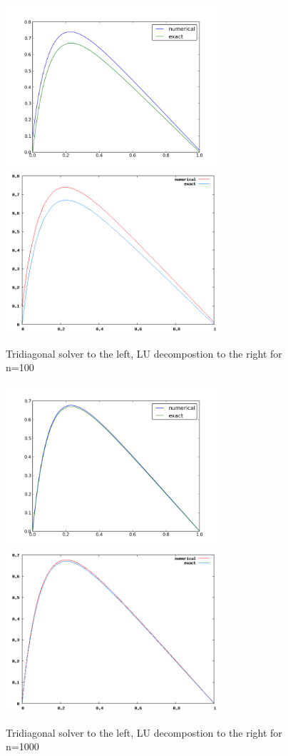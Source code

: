\documentclass[12pt,a4wide]{article}
\begin{document}
\begin{figure}
	\includegraphics[width=8cm]{project1n100}
	\includegraphics[width=8cm]{LUn100}
	\caption{Tridiagonal solver to the left, LU decompostion to the right for n=100}
	\label{n100}
\end{figure}
\begin{figure}
	\includegraphics[width=8cm]{project1n1000}
	\includegraphics[width=8cm]{LUn1000}
	\caption{Tridiagonal solver to the left, LU decompostion to the right for n=1000}
	\label{n1000}
\end{figure}
\end{document}
